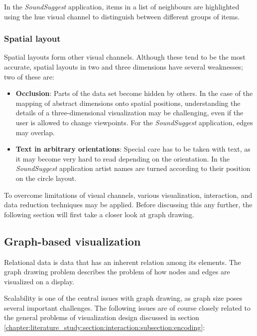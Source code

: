 In the \emph{SoundSuggest} application, items in a list of neighbours are highlighted using the hue visual channel to distinguish between different groups of items.


\subsubsection{Spatial layout}

Spatial layouts form other visual channels. Although these tend to be the most accurate, spatial layouts in two and three dimensions have several weaknesses; two of these are\cite{shirley:2009}:

\begin{itemize}
	\item \textbf{Occlusion}: Parts of the data set become hidden by others. In the case of the mapping of abstract dimensions onto spatial positions, understanding the details of a three-dimensional visualization may be challenging, even if the user is allowed to change viewpoints. For the \emph{SoundSuggest} application, edges may overlap.
	\item \textbf{Text in arbitrary orientations}: Special care has to be taken with text, as it may become very hard to read depending on the orientation. In the \emph{SoundSuggest} application artist names are turned according to their position on the circle layout.
\end{itemize}


To overcome limitations of visual channels, various visualization, interaction, and data reduction techniques may be applied\cite{keim:2002, shirley:2009, ware:2004}. Before discussing this any further, the following section will first take a closer look at graph drawing.



\subsection{Graph-based visualization}\label{chapter:literature_study:section:interaction:subsection:graphs}

Relational data is data that has an inherent relation among its elements\cite{shirley:2009}. The graph drawing problem describes the problem of how nodes and edges are visualized on a display\cite{herman:2000}.

Scalability is one of the central issues with graph drawing, as graph size poses several important challenges\cite{herman:2000}. The following issues are of course closely related to the general problems of visualization design discussed in section \ref{chapter:literature_study:section:interaction:subsection:encoding}:

